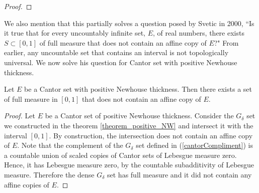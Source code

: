 \begin{proof}

\end{proof}

We also mention that this partially solves a question posed by Svetic\cite{Svetic} in 2000, ``Is it true that for every uncountably infinite set, $E$, of real numbers, there exists $S \subset [0,1]$ of full measure that does not contain an affine copy of $E$?"  From earlier, any uncountable set that contains an interval is not topologically universal. We now solve his question for Cantor set with positive Newhouse thickness. 
\begin{theorem}
    Let $E$ be a Cantor set with positive Newhouse thickness.  Then there exists a set of full measure in $[0,1]$ that does not contain an affine copy of $E$. 
\end{theorem}
\begin{proof}
    Let $E$ be a Cantor set of positive Newhouse thickness. Consider the $G_{\delta}$ set we constructed in the theorem \ref{theorem_positive_NW} and intersect it with the interval $[0,1]$.  By construction, the intersection does not contain an affine copy of $E$.   Note that the complement of the $G_\delta$ set defined in (\ref{cantorCompliment}) is a countable union of scaled copies of Cantor sets of Lebesgue measure zero. Hence, it has Lebesgue measure zero, by the countable subadditivity of Lebesgue measure.  Therefore the dense $G_{\delta}$ set  has full measure and it did not contain any affine copies of $E$.
\end{proof}




